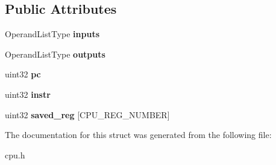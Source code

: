 \subsection*{Public Attributes}
\begin{DoxyCompactItemize}
\item 
\hypertarget{structTrace_1_1Record_aba28a18d28949eacc7f9053b6ef85c81}{
OperandListType {\bfseries inputs}}
\label{structTrace_1_1Record_aba28a18d28949eacc7f9053b6ef85c81}

\item 
\hypertarget{structTrace_1_1Record_ae5f156de424fc9289773bca8ecfaff33}{
OperandListType {\bfseries outputs}}
\label{structTrace_1_1Record_ae5f156de424fc9289773bca8ecfaff33}

\item 
\hypertarget{structTrace_1_1Record_a7ef5267ef3122f653c675efd32dbce70}{
uint32 {\bfseries pc}}
\label{structTrace_1_1Record_a7ef5267ef3122f653c675efd32dbce70}

\item 
\hypertarget{structTrace_1_1Record_a78b942443619b45c7484fd22c2274480}{
uint32 {\bfseries instr}}
\label{structTrace_1_1Record_a78b942443619b45c7484fd22c2274480}

\item 
\hypertarget{structTrace_1_1Record_a2412276632ed5e14e36fc75d44fa8bcf}{
uint32 {\bfseries saved\_\-reg} \mbox{[}CPU\_\-REG\_\-NUMBER\mbox{]}}
\label{structTrace_1_1Record_a2412276632ed5e14e36fc75d44fa8bcf}

\end{DoxyCompactItemize}


The documentation for this struct was generated from the following file:\begin{DoxyCompactItemize}
\item 
cpu.h\end{DoxyCompactItemize}
